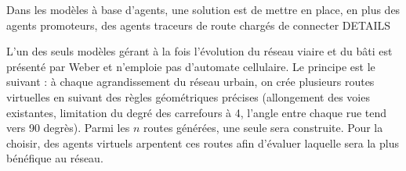 \documentclass[10pt]{article}
\begin{document}
\begin{multicols}{2}
Dans les modèles à base d'agents, une solution est de mettre en place,
en plus des agents promoteurs, des agents traceurs de route chargés de
connecter DETAILS

L'un des seuls modèles gérant à la fois l'évolution du réseau viaire
et du bâti est présenté par Weber \cite{Weber2009} et n'emploie pas
d'automate cellulaire. Le principe est le suivant : à chaque
agrandissement du réseau urbain, on crée plusieurs routes virtuelles
en suivant des règles géométriques précises (allongement des voies
existantes, limitation du degré des carrefours à 4, l'angle entre
chaque rue tend vers 90 degrès). Parmi les $n$ routes générées, une
seule sera construite. Pour la choisir, des agents virtuels arpentent
ces routes afin d'évaluer laquelle sera la plus bénéfique au réseau.

\end{multicols}













\printbibliography
\end{document}
